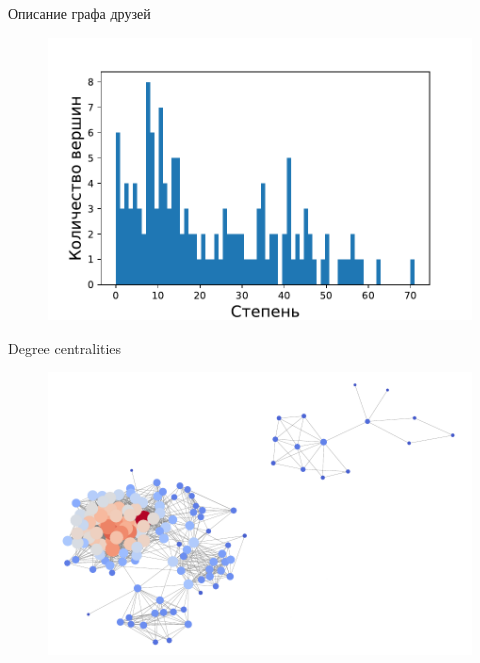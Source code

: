 \documentclass{beamer}
\begin{document}
\begin{frame} {Описание графа друзей}
\begin{figure}[h!t]\center
\includegraphics[width=1\textwidth]{degree.pdf}
\label{fig2}
\end{figure}
\end{frame}

\begin{frame} {Degree centralities}
\begin{figure}[h!t]\center
\includegraphics[width=1\textwidth]{degree_centralities.pdf}
\label{fig3}
\end{figure}
\end{frame}
\end{document}
